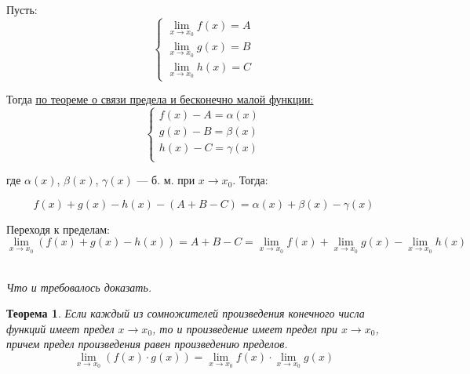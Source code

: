 \documentclass[a4paper,12pt,oneside]{extbook}
\newcommand{\newpar}{$ $\par\nobreak\ignorespaces}
\theoremstyle{numbered}
\theoremstyle{unnumbered}
\theoremstyle{named}
\newtheorem{theorem}{Теорема}[section]
\theoremstyle{unnumbered}
\theoremstyle{named}
\theoremstyle{named}
\theoremstyle{named}
\renewenvironment{proof}[1][]{\breakenv[Доказательство]{\if\relax\detokenize{#1}\relax\else\;\fi}{\textbf{#1}}}{\smallskip\newpar \hfill\textit{Что и требовалось доказать.}}
\newcommand{\plink}[2]{\hyperref[#1]{\color{blue}\underline{#2}}}
\begin{document}
\begin{proof}
    Пусть:
    \[
        \begin{cases}
            \displaystyle
            \lim_{x \to x_0}{f(x)} = A \\
            \displaystyle
            \lim_{x \to x_0}{g(x)} = B \\
            \displaystyle
            \lim_{x \to x_0}{h(x)} = C
        \end{cases}
    \]

    Тогда \plink{theorem:Теорема о связи функции, ее предела и бесконечно малой функции}{по теореме о связи предела и бесконечно малой функции:}
    \[
        \begin{cases}
            f(x) - A = \alpha(x) \\
            g(x) - B = \beta(x)  \\
            h(x) - C = \gamma(x) \\
        \end{cases}
    \]

    где \(\alpha(x)\), \(\beta(x)\), \(\gamma(x)\) — б. м. при \(x \to x_0\). Тогда:

    \[
        f(x) + g(x) - h(x) - (A + B - C) = \alpha(x) + \beta(x) - \gamma(x)
    \]

    Переходя к пределам:
    \[
        \lim_{x \to x_0}{(f(x) + g(x) - h(x))} = A + B - C = \lim_{x \to x_0}{f(x)} + \lim_{x \to x_0}{g(x)} - \lim_{x \to x_0}{h(x)}
    \]
\end{proof}

\begin{theorem}
    Если каждый из сомножителей произведения конечного числа функций имеет предел \(x \to x_0\), то и произведение имеет предел при \(x \to x_0\), причем предел произведения равен произведению пределов.
    \[
        \lim_{x \to x_0}{(f(x) \cdot g(x))} = \lim_{x \to x_0}{f(x)} \cdot \lim_{x \to x_0}{g(x)}
    \]
\end{theorem}
\end{document}
